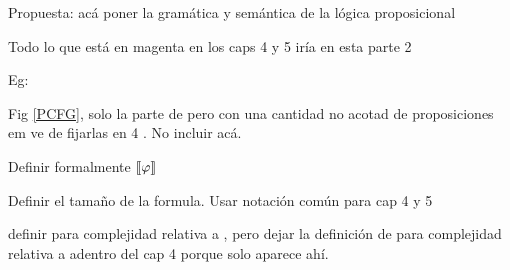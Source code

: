 

    \color{magenta}
    Propuesta: acá poner la gramática y semántica de la lógica proposicional

    Todo lo que está en magenta en los caps 4 y 5 iría en esta parte 2

    Eg:
    
    Fig \ref{PCFG}, solo la parte de \grambool pero con una cantidad no acotad de proposiciones em ve de fijarlas en 4 . No incluir \gramboolxor acá.

    Definir formalmente $\llbracket \varphi\rrbracket$

    Definir el tamaño de la formula. Usar notación común para cap 4 y 5

    definir  \mdl{\grambool} para complejidad relativa a \grambool, pero dejar la definición de
      \mdl{\gramboolxor} para complejidad relativa a \gramboolxor adentro del cap 4 porque solo aparece ahí. 





    \color{black}